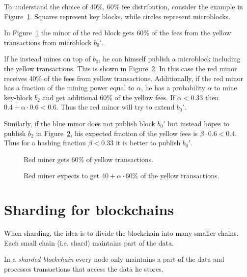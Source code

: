 \begin{example}
To understand the choice of 40\%, 60\% fee distribution, consider the example in Figure~\ref{fig:bitng-1}. Squares represent key blocks, while circles represent microblocks. 

In Figure~\ref{fig:bitng-1} the minor of the red block gets 60\% of the fees from the yellow transactions from microblock $b_0'$.

If he instead mines on top of $b_0$, he can himself publish a microblock including the yellow transactions. This is shown in Figure~\ref{fig:bitng-2}.
In this case the red minor receives 40\% of the fees from yellow transactions. 
Additionally, if the red minor has a fraction of the mining power equal to $\alpha$, he has a probability $\alpha$ to mine key-block $b_2$ and get additional 60\% of the yellow fees. 
If $\alpha<0.33$ then $0.4+\alpha\cdot 0.6 < 0.6$. Thus the red minor will try to extend $b_0'$.

Similarly, if the blue minor does not publish block $b_0'$ but instead hopes to publish $b_2$ in Figure~\ref{fig:bitng-2}, his expected fraction of the yellow fees is $\beta\cdot 0.6 <0.4$. Thus for a hashing fraction $\beta<0.33$ it is better to publish $b_0'$.
	\begin{figure}[h]
		\centering
		
		\caption{Red miner gets 60\% of yellow transactions.}
		\label{fig:bitng-1}
	\end{figure}
	\begin{figure}[h]
		\centering
		
		\caption{Red miner expects to get $40+\alpha\cdot 60$\% of the yellow transactions.}
		\label{fig:bitng-2}
	\end{figure}

	
\end{example}



\section{Sharding for blockchains}
When sharding, the idea is to divide the blockchain into many smaller chains. Each small chain (i.e. shard) maintains part of the data.

\begin{definition} In a \emph{sharded blockchain} every node only maintains a part of the data and processes transactions that access the data he stores.
\end{definition}

